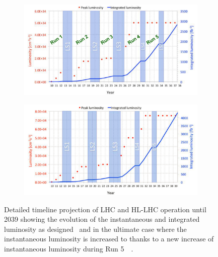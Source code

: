 	\begin{figure}[H]
		\begin{subfigure}{\linewidth}
			\centering
			\includegraphics[width=\plotwidth]{fig/chapt2/HL-LHC-nominal.png}
			\caption{\label{fig:HL-LHC-Timeline:A}}
		\end{subfigure}
		\begin{subfigure}{\linewidth}
			\centering
			\includegraphics[width=\plotwidth]{fig/chapt2/HL-LHC-ultimate.png}
			\caption{\label{fig:HL-LHC-Timeline:B}}
		\end{subfigure}
		\caption{\label{fig:HL-LHC-Timeline} Detailed timeline projection of LHC and HL-LHC operation until 2039 showing the evolution of the instantaneous and integrated luminosity as designed~ and in the ultimate case where the instantaneous luminosity is increased to \siflux thanks to a new increase of instantaneous luminosity during Run 5~~\cite{HLLHC2017,HLLHCPDR,PHASEIITP}.}
	\end{figure}
	
